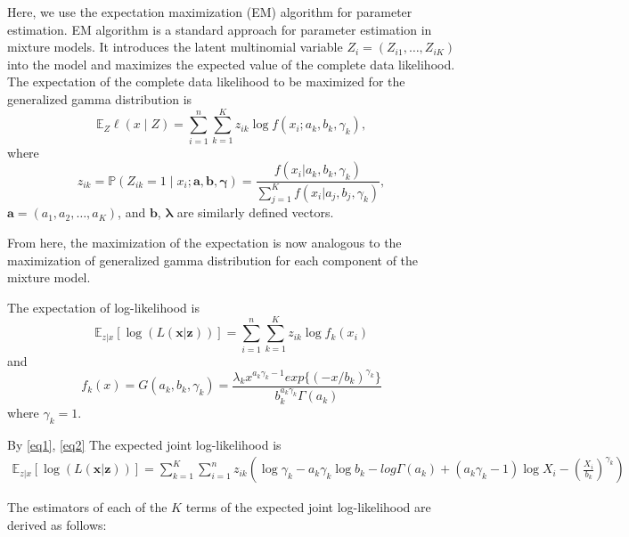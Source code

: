 \documentclass[
  letterpaper,
  DIV=11,
  numbers=noendperiod,
  oneside]{scrreprt}
\begin{document}
Here, we use the expectation maximization (EM) algorithm
\citep{dempster_maximum_1977} for parameter estimation. EM algorithm is
a standard approach for parameter estimation in mixture models. It
introduces the latent multinomial variable
\(Z_{i} = (Z_{i1}, \ldots, Z_{iK})\) into the model and maximizes the
expected value of the complete data
likelihood\citep{dempster_maximum_1977}. The expectation of the complete
data likelihood to be maximized for the generalized gamma distribution
is \begin{equation*}
\mathbb{E}_Z \ell(x \mid Z) = \sum_{i=1}^n \sum_{k=1}^K z_{ik} \log f(x_i; a_k, b_k,\gamma_k),
\end{equation*} where \begin{equation}
 \label{eq:lambdaFormula}
    z_{ik} = \mathbb{P}(Z_{ik}=1 \mid x_i;\pmb{ a, b, \gamma} ) =\frac{f(x_i|a_k, b_k, \gamma_k)}{\displaystyle\sum^K_{j=1}f(x_i|a_j, b_j, \gamma_k)},
 \end{equation} \(\mathbf{a} = (a_1, a_2, \ldots, a_K)\), and
\(\mathbf{b}\), \(\pmb \lambda\) are similarly defined vectors.

From here, the maximization of the expectation is now analogous to the
maximization of generalized gamma distribution for each component of the
mixture model.

The expectation of log-likelihood is \begin{equation}
    \mathbb E_{z|x}[\log(L(\mathbf{x}|\mathbf{z}))]=\sum^{n}_{i=1}\sum^{K}_{k=1}z_{ik}\log f_k(x_i) \label{eq1}
\end{equation} and \begin{equation}
f_k(x)=G(a_k,b_k,{\gamma_k})=\frac{\lambda_k x^{a_k{\gamma_k}-1}exp\{(-x/b_k)^{{\gamma_k}}\}}{b_k^{a_k{\gamma_k}}\Gamma(a_k)} \label{eq2}
\end{equation} where \({\gamma_k}=1\).

By \eqref{eq1}, \eqref{eq2} The expected joint log-likelihood is
\begin{multline} \label{eq3}
     \mathbb E_{z|x}[\log(L(\mathbf{x}|\mathbf{z}))]=\sum^{K}_{k=1}\sum^{n}_{i=1}z_{ik}\left( \log{\gamma_k}-a_k{\gamma_k} \log b_k-log\Gamma(a_k)+(a_k{\gamma_k}-1)\log X_i-(\frac{X_i}{b_k})^{{\gamma_k}} \right)
\end{multline}

The estimators of each of the \(K\) terms of the expected joint
log-likelihood are derived as follows:
\end{document}
